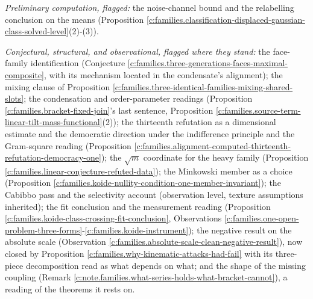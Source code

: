 \documentclass[11pt]{article}
\theoremstyle{definition}
\theoremstyle{plain}
\begin{document}
\emph{Preliminary computation, flagged:} the noise-channel bound and the relabelling conclusion on the means (Proposition \ref{c:families.classification-displaced-gaussian-class-solved-level}(2)-(3)).

\emph{Conjectural, structural, and observational, flagged where they stand:} the face-family identification (Conjecture \ref{c:families.three-generations-faces-maximal-composite}, with its mechanism located in the condensate's alignment); the mixing clause of Proposition \ref{c:families.three-identical-families-mixing-shared-slots}; the condensation and order-parameter readings (Proposition \ref{c:families.bracket-fixed-join}'s last sentence, Proposition \ref{c:families.source-term-linear-tilt-mass-functional}(2)); the thirteenth refutation as a dimensional estimate and the democratic direction under the indifference principle and the Gram-square reading (Proposition \ref{c:families.alignment-computed-thirteenth-refutation-democracy-one}); the $\sqrt{m}$ coordinate for the heavy family (Proposition \ref{c:families.linear-conjecture-refuted-data}); the Minkowski member as a choice (Proposition \ref{c:families.koide-nullity-condition-one-member-invariant}); the Cabibbo pass and the selectivity account (observation level, texture assumptions inherited); the fit conclusion and the measurement reading (Proposition \ref{c:families.koide-class-crossing-fit-conclusion}, Observations \ref{c:families.one-open-problem-three-forms}-\ref{c:families.koide-instrument}); the negative result on the absolute scale (Observation \ref{c:families.absolute-scale-clean-negative-result}), now closed by Proposition \ref{c:families.why-kinematic-attacks-had-fail} with its three-piece decomposition read as what depends on what; and the shape of the missing coupling (Remark \ref{c:note.families.what-series-holds-what-bracket-cannot}), a reading of the theorems it rests on.
\end{document}
